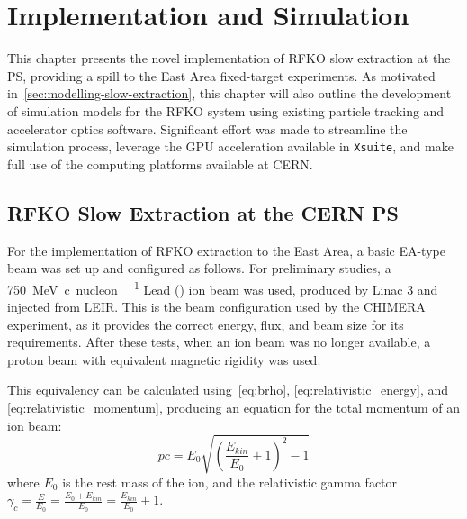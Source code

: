 \documentclass[a4paper,twoside,11pt]{report}
\begin{document}
\chapter{Implementation and Simulation}\label{chap:implementation}

This chapter presents the novel implementation of RFKO slow extraction at the PS, providing a spill to the East Area fixed-target experiments. As motivated in~\autoref{sec:modelling-slow-extraction}, this chapter will also outline the development of simulation models for the RFKO system using existing particle tracking and accelerator optics software. Significant effort was made to streamline the simulation process, leverage the GPU acceleration available in \verb|Xsuite|, and make full use of the computing platforms available at CERN.

\section{RFKO Slow Extraction at the CERN PS}

For the implementation of RFKO extraction to the East Area, a basic EA-type beam was set up and configured as follows. For preliminary studies, a \qty[per-mode=symbol]{750}{\mega\electronvolt\per~c\per nucleon} Lead () ion beam was used, produced by Linac 3 and injected from LEIR. This is the beam configuration used by the CHIMERA experiment, as it provides the correct energy, flux, and beam size for its requirements. After these tests, when an ion beam was no longer available, a proton beam with equivalent magnetic rigidity was used.

This equivalency can be calculated using~\autoref{eq:brho}, \autoref{eq:relativistic_energy}, and \autoref{eq:relativistic_momentum}, producing an equation for the total momentum of an ion beam:
\begin{equation}
  pc=E_0\sqrt{\left( \frac{E_{kin}}{E_0}+1\right)^2-1}
  \label{eq:ion_momentum}
\end{equation} where $E_0$ is the rest mass of the ion, and the relativistic gamma factor $\gamma_c = \frac{E}{E_0}=\frac{E_0+E_{kin}}{E_0}=\frac{E_{kin}}{E_0}+1$.
\end{document}
